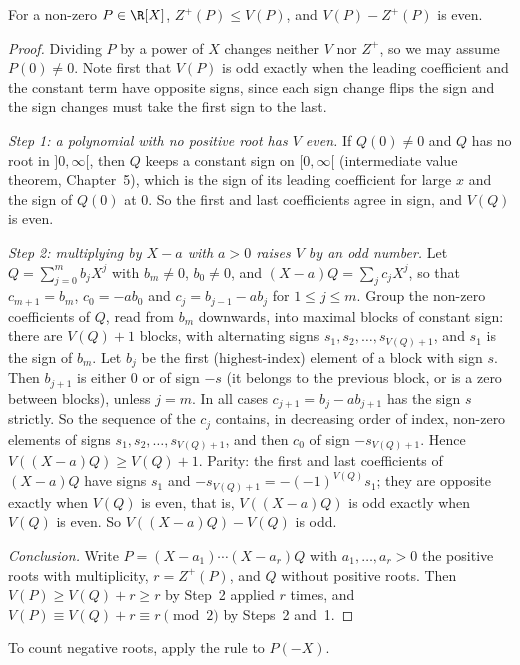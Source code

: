 \begin{theorem}\label{thm:descartes}
For a non-zero $P\in\R[X]$, $Z^+(P)\le V(P)$, and $V(P)-Z^+(P)$ is even.
\end{theorem}
\begin{proof}
Dividing $P$ by a power of $X$ changes neither $V$ nor $Z^+$, so we may assume $P(0)\ne0$. Note first that $V(P)$ is odd exactly when the leading
coefficient and the constant term have opposite signs, since each sign change flips the sign and the sign changes must take the first sign to the last.

\emph{Step 1: a polynomial with no positive root has $V$ even.} If $Q(0)\ne0$ and $Q$ has no root in $]0,\infty[$, then $Q$ keeps a constant sign on
$[0,\infty[$ (intermediate value theorem, Chapter~5), which is the sign of its leading coefficient for large $x$ and the sign of $Q(0)$ at $0$. So the
first and last coefficients agree in sign, and $V(Q)$ is even.

\emph{Step 2: multiplying by $X-a$ with $a>0$ raises $V$ by an odd number.} Let $Q=\sum_{j=0}^mb_jX^j$ with $b_m\ne0$, $b_0\ne0$, and
$(X-a)Q=\sum_jc_jX^j$, so that $c_{m+1}=b_m$, $c_0=-ab_0$ and $c_j=b_{j-1}-ab_j$ for $1\le j\le m$. Group the non-zero coefficients of $Q$, read from
$b_m$ downwards, into maximal blocks of constant sign: there are $V(Q)+1$ blocks, with alternating signs $s_1,s_2,\dots,s_{V(Q)+1}$, and $s_1$ is the
sign of $b_m$. Let $b_j$ be the first (highest-index) element of a block with sign $s$. Then $b_{j+1}$ is either $0$ or of sign $-s$ (it belongs to
the previous block, or is a zero between blocks), unless $j=m$. In all cases $c_{j+1}=b_j-ab_{j+1}$ has the sign $s$ strictly. So the sequence of the $c_j$
contains, in decreasing order of index, non-zero elements of signs $s_1,s_2,\dots,s_{V(Q)+1}$, and then $c_0$ of sign $-s_{V(Q)+1}$. Hence
$V((X-a)Q)\ge V(Q)+1$. Parity: the first and last coefficients of $(X-a)Q$ have signs $s_1$ and $-s_{V(Q)+1}=-(-1)^{V(Q)}s_1$; they are opposite exactly
when $V(Q)$ is even, that is, $V((X-a)Q)$ is odd exactly when $V(Q)$ is even. So $V((X-a)Q)-V(Q)$ is odd.

\emph{Conclusion.} Write $P=(X-a_1)\cdots(X-a_r)Q$ with $a_1,\dots,a_r>0$ the positive roots with multiplicity, $r=Z^+(P)$, and $Q$ without positive
roots. Then $V(P)\ge V(Q)+r\ge r$ by Step~2 applied $r$ times, and $V(P)\equiv V(Q)+r\equiv r\pmod2$ by Steps~2 and~1.
\end{proof}

To count negative roots, apply the rule to $P(-X)$.

